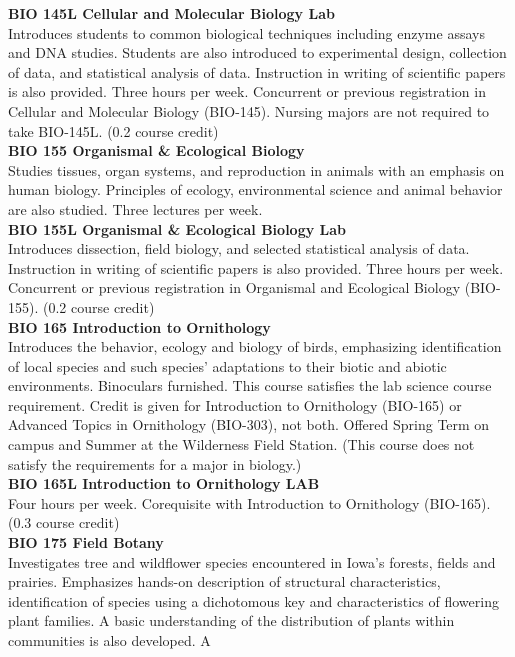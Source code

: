 \documentclass[
  letterpaper,
]{scrbook}
\begin{document}
\textbf{BIO 145L Cellular and Molecular Biology Lab}\\
Introduces students to common biological techniques including enzyme
assays and DNA studies. Students are also introduced to experimental
design, collection of data, and statistical analysis of data.
Instruction in writing of scientific papers is also provided. Three
hours per week. Concurrent or previous registration in Cellular and
Molecular Biology (BIO-145). Nursing majors are not required to take
BIO-145L. (0.2 course credit)\\
\textbf{BIO 155 Organismal \& Ecological Biology}\\
Studies tissues, organ systems, and reproduction in animals with an
emphasis on human biology. Principles of ecology, environmental science
and animal behavior are also studied. Three lectures per week.\\
\textbf{BIO 155L Organismal \& Ecological Biology Lab}\\
Introduces dissection, field biology, and selected statistical analysis
of data. Instruction in writing of scientific papers is also provided.
Three hours per week. Concurrent or previous registration in Organismal
and Ecological Biology (BIO-155). (0.2 course credit)\\
\textbf{BIO 165 Introduction to Ornithology}\\
Introduces the behavior, ecology and biology of birds, emphasizing
identification of local species and such species' adaptations to their
biotic and abiotic environments. Binoculars furnished. This course
satisfies the lab science course requirement. Credit is given for
Introduction to Ornithology (BIO-165) or Advanced Topics in Ornithology
(BIO-303), not both. Offered Spring Term on campus and Summer at the
Wilderness Field Station. (This course does not satisfy the requirements
for a major in biology.)\\
\textbf{BIO 165L Introduction to Ornithology LAB}\\
Four hours per week. Corequisite with Introduction to Ornithology
(BIO-165). (0.3 course credit)\\
\textbf{BIO 175 Field Botany}\\
Investigates tree and wildflower species encountered in Iowa's forests,
fields and prairies. Emphasizes hands-on description of structural
characteristics, identification of species using a dichotomous key and
characteristics of flowering plant families. A basic understanding of
the distribution of plants within communities is also developed. A
\end{document}
